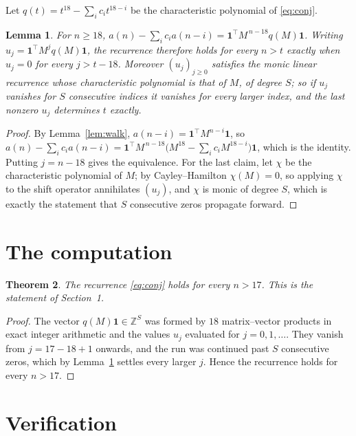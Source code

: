 \documentclass[11pt,a4paper]{article}
\theoremstyle{plain}
\newtheorem{theorem}{Theorem}
\newtheorem{lemma}[theorem]{Lemma}
\theoremstyle{definition}
\begin{document}
Let $q(t)=t^{18}-\sum_i c_i t^{18-i}$ be the characteristic polynomial of
\eqref{eq:conj}.

\begin{lemma}\label{lem:crit}
For $n\ge18$,
$a(n)-\sum_i c_i a(n-i)=\mathbf{1}^{\!\top}M^{\,n-18}q(M)\mathbf{1}$. Writing
$u_j=\mathbf{1}^{\!\top}M^{j}q(M)\mathbf{1}$, the recurrence therefore holds for every
$n>t$ exactly when $u_j=0$ for every $j>t-18$. Moreover $(u_j)_{j\ge0}$ satisfies the
monic linear recurrence whose characteristic polynomial is that of $M$, of degree $S$; so
if $u_j$ vanishes for $S$ consecutive indices it vanishes for every larger index, and the
last nonzero $u_j$ determines $t$ exactly.
\end{lemma}

\begin{proof}
By Lemma~\ref{lem:walk}, $a(n-i)=\mathbf{1}^{\!\top}M^{n-i}\mathbf{1}$, so
$a(n)-\sum_i c_i a(n-i)
=\mathbf{1}^{\!\top}M^{\,n-18}\bigl(M^{18}-\sum_i c_i M^{18-i}\bigr)
\mathbf{1}$, which is the identity. Putting $j=n-18$ gives the equivalence. For the
last claim, let $\chi$ be the characteristic polynomial of $M$; by Cayley--Hamilton
$\chi(M)=0$, so applying $\chi$ to the shift operator annihilates $(u_j)$, and $\chi$ is
monic of degree $S$, which is exactly the statement that $S$ consecutive zeros propagate
forward.
\end{proof}

\section{The computation}

\begin{theorem}
The recurrence \eqref{eq:conj} holds for every $n>17$. This is the statement of
Section~1.
\end{theorem}

\begin{proof}
The vector $q(M)\mathbf{1}\in\mathbb{Z}^{S}$ was formed by $18$ matrix--vector
products in exact integer arithmetic and the values $u_j$ evaluated for
$j=0,1,\dots$. They vanish from $j=17-18+1$ onwards, and the run was continued past
$S$ consecutive zeros, which by Lemma~\ref{lem:crit} settles every larger $j$. Hence the
recurrence holds for every $n>17$.
\end{proof}

\section{Verification}
\end{document}
